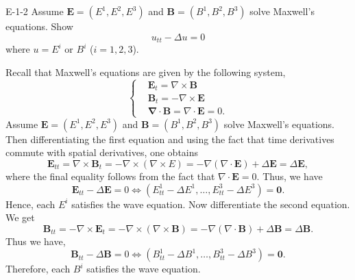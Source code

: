 \documentclass{article}
\begin{document}
	\begin{prb}{E-1-2}
		Assume $\mathbf{E} = (E^{1}, E^{2}, E^{3})$ and $\mathbf{B} = (B^{1}, B^{2}, B^{3})$ solve Maxwell's equations. Show 
		\begin{equation*}
			u_{tt} - \Delta u= 0
		\end{equation*}
		where $u = E^{i}$ or $B^{i}$ ($i = 1, 2, 3$). 
	\end{prb}
	Recall that Maxwell's equations are given by the following system, 
	\begin{equation*}
		\left\{
		\begin{alignedat}{1}
			&\mathbf{E}_{t} = \nabla \times \mathbf{B} \\
			&\mathbf{B}_{t} = -\nabla \times \mathbf{E} \\
			&\mathbf{\nabla} \cdot \mathbf{B}= \nabla \cdot \mathbf{E} =0. 
		\end{alignedat}
		\right.
	\end{equation*}
	Assume $\mathbf{E} = (E^{1}, E^{2}, E^{3})$ and $\mathbf{B} = (B^{1}, B^{2}, B^{3})$ solve Maxwell's equations. Then differentiating the first equation and using the fact that time derivatives commute with spatial derivatives, one obtains 
	\begin{equation*}
		\mathbf{E}_{tt} = \nabla \times \mathbf{B}_{t} = -\nabla \times (\nabla \times E) = -\nabla (\nabla \cdot \mathbf{E}) + \Delta \mathbf{E} = \Delta \mathbf{E}, 
	\end{equation*}
	where the final equality follows from the fact that $\nabla \cdot \mathbf{E} = 0$. Thus, we have 
	\begin{equation*}
		\mathbf{E}_{tt} - \Delta \mathbf{E} = 0 \iff (E^{1}_{tt} - \Delta E^{1}, \ldots, E^{3}_{tt} - \Delta E^{3}) = \mathbf{0}. 
	\end{equation*}
	Hence, each $E^{i}$ satisfies the wave equation. Now differentiate the second equation. We get 
	\begin{equation*}
		\mathbf{B}_{tt} =-\nabla \times \mathbf{E}_{t} = -\nabla \times (\nabla \times \mathbf{B}) = -\nabla (\nabla \cdot \mathbf{B}) + \Delta \mathbf{B} = \Delta \mathbf{B}. 
	\end{equation*}
	Thus we have, 
	\begin{equation*}
		\mathbf{B}_{tt} - \Delta \mathbf{B} = 0 \iff (B^{1}_{tt} - \Delta B^{1}, \ldots, B^{3}_{tt} - \Delta B^{3}) = \mathbf{0}. 
	\end{equation*}
	Therefore, each $B^{i}$ satisfies the wave equation. 
	
\end{document}

